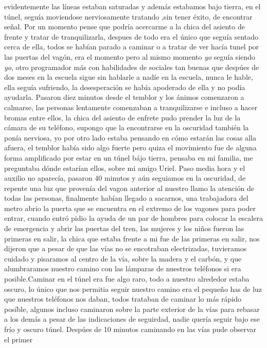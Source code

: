 \documentclass[letterpaper]{article}
\begin{document}
evidentemente las líneas estaban saturadas y además estabamos bajo tierra, en el túnel, seguía
moviendose nerviosamente tratando ,sin tener éxito, de encontrar señal. Por un momento pense que
podría acercarme a la chica del asiento de frente y tratar de tranquilizarla, despues de todo era el
único que seguía sentado cerca de ella, todos se habían parado a caminar o a tratar de ver hacía
tunel por las puertas del vagón, era el momento pero al mismo momento \textit{yo} seguía siendo
\textit{yo}, otro programador más con habilidades de sociales tan buenas que despúes de dos meses en la escuela sigue
sin hablarle a nadíe en la escuela, nunca le hable, ella seguía sufriendo, la desesperación se había
apoderado de ella y no podía ayudarla. Pasaron diez minutos desde el temblor y los ánimos comenzaron
a calmarse, las personas lentamente comenzaban a tranquilizarse e incluso a hacer bromas entre
ellos, la chica del asiento de enfrete pudo prender la luz de la cámara de su teléfono, supongo que
la encontrarse en la oscuridad también la ponía nerviosa, yo por otro lado estaba pensando en cómo
estarán las cosas alla afuera, el temblor había sido algo fuerte pero quiza el movimiento fue de
alguna forma amplificado por estar en un túnel bájo tierra, pensaba en mi familia, me preguntaba
dónde estarían ellos, sobre mi amigo Uriel. Paso media hora y el auxilio no aparecía, pasaron 40
minutos y aún seguiamos en la oscuridad, de repente una luz que provenía del vagon anterior al
nuestro llamo la atención de todas las personas, finalmente habían llegado a sacarnos, una
trabajadora del metro abrio la puerta que se encuentra en el extremo de los vagones para poder
entrar, cuando entró pidio la ayuda de un par de hombres para colocar la escalera de emergencia y
abrir las puertas del tren, las mujeres y los niños fueron las primeras en salir, la chica que
estaba frente a mi fue de las primeras en salir, nos dijeron que a pesar de que las vías no se
encotraban electrizadas, tuvieramos cuidado y pisaramos al centro de la vía, sobre la madera y el
carbón, y que alumbraramos nuestro camino con las lámparas de nuestros teléfonos si era
posible.Caminar en el túnel era fue algo raro, todo a nuestro alrededor estaba oscuro, lo único que
nos permitia seguir nuestro camino era el pequeño has de luz que nuestros teléfonos nos daban,
todos trataban de caminar lo más rápido posíble, algunos incluso caminaron sobre la parte exterior
de la vías para rebasar a los demás a pesar de las indicaciones de seguirdad, nadie quería seguir
bajo ese frío y oscuro túnel. Despúes de 10 minutos caminando en las vías pude observar el primer
\end{document}
